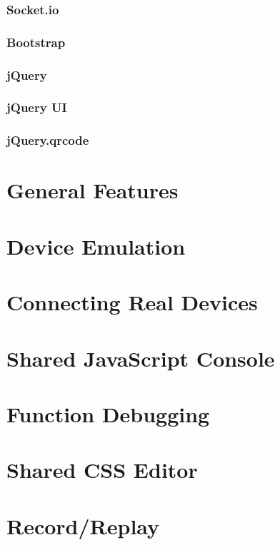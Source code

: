 \subsubsection{Socket.io}

\subsubsection{Bootstrap}

\subsubsection{jQuery}

\subsubsection{jQuery UI}

\subsubsection{jQuery.qrcode}

\section{General Features}

\section{Device Emulation}

\section{Connecting Real Devices}

\section{Shared JavaScript Console}

\section{Function Debugging}

\section{Shared CSS Editor}

\section{Record/Replay}